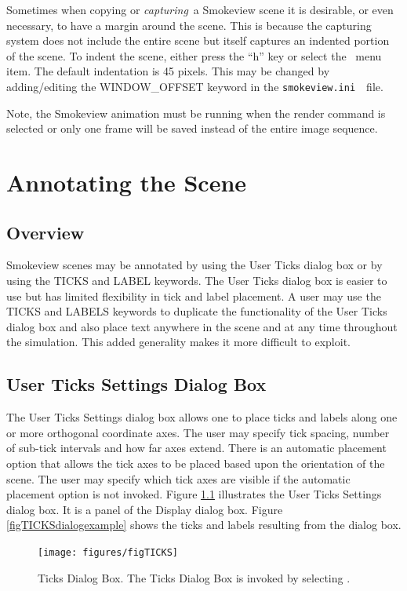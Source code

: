 \documentclass[11pt,twoside]{book}
\newcommand{\svini}{{\tt smokeview.ini}\ }
\newcommand{\figoptions}{hbp}
\newcommand{\frameit}[1]{\fbox{\tt #1}}
\begin{document}
Sometimes when copying or {\em capturing}\ a Smokeview scene it is
desirable, or even necessary, to have a margin around the scene.
This is because the capturing system does not include the entire
scene but itself captures an indented portion of the scene. To
indent the scene, either press the ``h'' key or select the
\ menu item. The
default indentation is 45 pixels. This may be changed by
adding/editing the WINDOW\_OFFSET keyword in the \svini\
file.

Note, the Smokeview animation must be running when the render command is selected or only one frame will be saved instead of the entire image sequence.

\chapter{Annotating the Scene }
\label{section:annotate} \label{subsect_features}
\section{Overview}
Smokeview scenes may be annotated by using the User Ticks dialog box or
by using the TICKS and LABEL keywords.  The User Ticks dialog box is
easier to use but  has limited flexibility in tick and label placement.
A user may use the TICKS and LABELS keywords to duplicate the functionality
of the User Ticks dialog box and also place text anywhere in the scene
and at any time throughout the simulation.  This added generality makes
it more difficult to exploit.


\section{User Ticks Settings Dialog Box}
The User Ticks Settings dialog box allows one to place
ticks and labels along one or more orthogonal coordinate axes.
The user may specify tick spacing, number of sub-tick intervals and how far  axes extend.  There is an automatic
placement option that allows the tick axes to be placed based upon
the orientation of the scene.  The user may specify which tick axes are visible if the automatic placement option is not
invoked.  Figure \ref{figTICKSdialog} illustrates the User Ticks Settings
dialog box.  It is a panel of the Display dialog box.  Figure \ref{figTICKSdialogexample} shows the ticks and labels resulting from the dialog box.

\begin{figure}[\figoptions]
\centerline{
\texttt{[image: figures/figTICKS]}
}
\caption[Ticks Dialog Box.]{Ticks Dialog Box.  The
Ticks Dialog Box is invoked by selecting
\frameit{Dialogs$>$Display}. }
\label{figTICKSdialog}
\end{figure}
\end{document}
